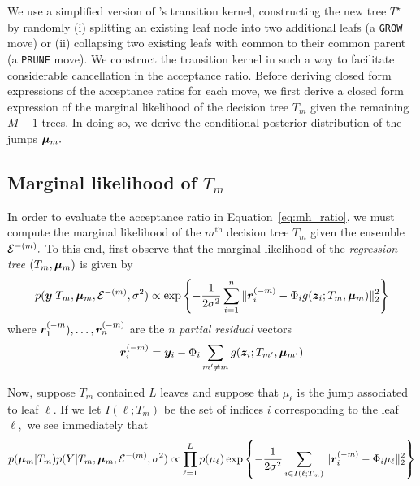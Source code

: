We use a simplified version of \citet{Chipman1998}'s transition kernel, constructing the new tree $T^{\star}$ by randomly (i) splitting an existing leaf node into two additional leafs (a \texttt{GROW} move) or (ii) collapsing two existing leafs with common to their common parent (a \texttt{PRUNE} move).
We construct the transition kernel in such a way to facilitate considerable cancellation in the acceptance ratio.
Before deriving closed form expressions of the acceptance ratios for each move, we first derive a closed form expression of the marginal likelihood of the decision tree $T_{m}$ given the remaining $M - 1$ trees.
In doing so, we derive the conditional posterior distribution of the jumps $\boldsymbol{\mu}_{m}.$

\subsection{Marginal likelihood of $T_{m}$}

In order to evaluate the acceptance ratio in Equation~\eqref{eq:mh_ratio}, we must compute the marginal likelihood of the $m^{\text{th}}$ decision tree $T_{m}$ given the ensemble $\mathcal{E}^{-(m)}.$
To this end, first observe that the marginal likelihood of the \textit{regression tree} $(T_{m}, \boldsymbol{\mu}_{m})$ is given by
\begin{equation}
\label{eq:reg_tree_likelihood1}
p(\bm{y} \vert T_{m}, \boldsymbol{\mu}_{m}, \mathcal{E}^{-(m)}, \sigma^{2}) \propto \exp\left\{-\frac{1}{2\sigma^{2}}\sum_{i = 1}^{n}{\lVert \bm{r}_{i}^{(-m)} - \Phi_{i}g(\bm{z}_{i}; T_{m}, \boldsymbol{\mu}_{m})\rVert_{2}^{2}}\right\}
\end{equation}
where $\bm{r}_{1}^{(-m}), \ldots, \bm{r}_{n}^{(-m)}$ are the $n$ \textit{partial residual} vectors
$$
\bm{r}_{i}^{(-m)} = \bm{y}_{i} - \Phi_{i}\sum_{m' \neq m}{g(\bm{z}_{i}; T_{m'}, \boldsymbol{\mu}_{m'})}
$$

Now, suppose $T_{m}$ contained $L$ leaves and suppose that $\mu_{\ell}$ is the jump associated to leaf $\ell.$
If we let $I(\ell;T_{m})$ be the set of indices $i$ corresponding to the leaf $\ell,$ we see immediately that
\begin{equation}
p(\boldsymbol{\mu}_{m} \vert T_{m})p(Y \vert T_{m}, \boldsymbol{\mu}_{m}, \mathcal{E}^{-(m)}, \sigma^{2}) \propto \prod_{\ell = 1}^{L}{p(\mu_{\ell})\exp\left\{-\frac{1}{2\sigma^{2}}\sum_{i \in I(\ell;T_{m})}{\lVert \bm{r}_{i}^{(-m)} - \Phi_{i}\mu_{\ell}\rVert_{2}^{2}}\right\}}
\end{equation}

